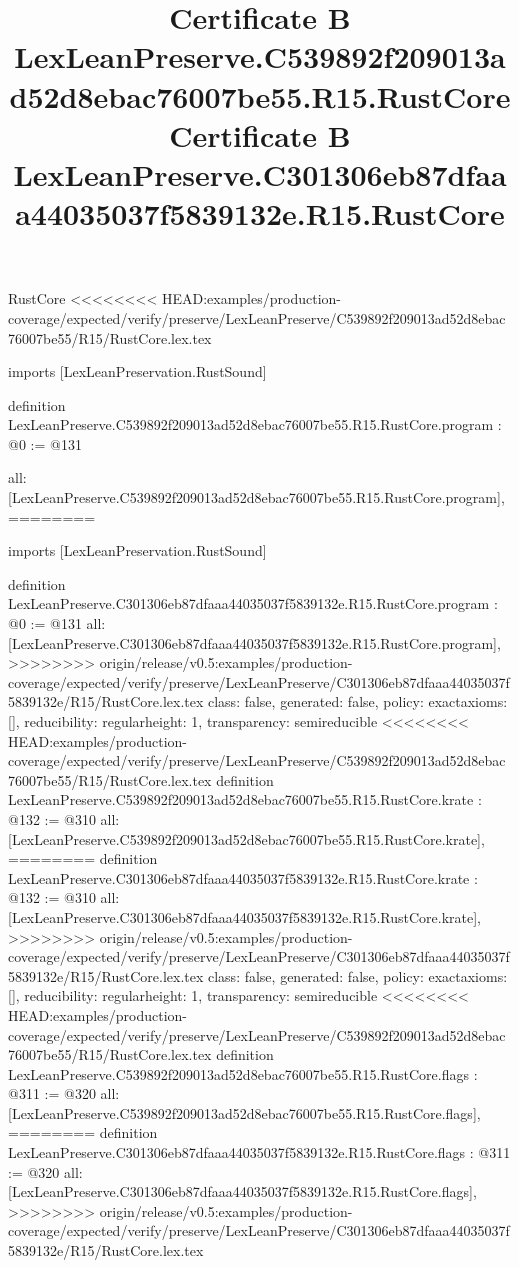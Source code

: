 \begin{lexlean}{RustCore}
<<<<<<<< HEAD:examples/production-coverage/expected/verify/preserve/LexLeanPreserve/C539892f209013ad52d8ebac76007be55/R15/RustCore.lex.tex
\title{Certificate B LexLeanPreserve.C539892f209013ad52d8ebac76007be55.R15.RustCore}
\begin{coremodule}
imports [LexLeanPreservation.RustSound]

definition LexLeanPreserve.C539892f209013ad52d8ebac76007be55.R15.RustCore.program : @0 := @131 {
  all: [LexLeanPreserve.C539892f209013ad52d8ebac76007be55.R15.RustCore.program],
========
\title{Certificate B LexLeanPreserve.C301306eb87dfaaa44035037f5839132e.R15.RustCore}
\begin{coremodule}
imports [LexLeanPreservation.RustSound]

definition LexLeanPreserve.C301306eb87dfaaa44035037f5839132e.R15.RustCore.program : @0 := @131 {
  all: [LexLeanPreserve.C301306eb87dfaaa44035037f5839132e.R15.RustCore.program],
>>>>>>>> origin/release/v0.5:examples/production-coverage/expected/verify/preserve/LexLeanPreserve/C301306eb87dfaaa44035037f5839132e/R15/RustCore.lex.tex
  class: false,
  generated: false,
  policy: exact{axioms: []},
  reducibility: regular{height: 1},
  transparency: semireducible
}
<<<<<<<< HEAD:examples/production-coverage/expected/verify/preserve/LexLeanPreserve/C539892f209013ad52d8ebac76007be55/R15/RustCore.lex.tex
definition LexLeanPreserve.C539892f209013ad52d8ebac76007be55.R15.RustCore.krate : @132 := @310 {
  all: [LexLeanPreserve.C539892f209013ad52d8ebac76007be55.R15.RustCore.krate],
========
definition LexLeanPreserve.C301306eb87dfaaa44035037f5839132e.R15.RustCore.krate : @132 := @310 {
  all: [LexLeanPreserve.C301306eb87dfaaa44035037f5839132e.R15.RustCore.krate],
>>>>>>>> origin/release/v0.5:examples/production-coverage/expected/verify/preserve/LexLeanPreserve/C301306eb87dfaaa44035037f5839132e/R15/RustCore.lex.tex
  class: false,
  generated: false,
  policy: exact{axioms: []},
  reducibility: regular{height: 1},
  transparency: semireducible
}
<<<<<<<< HEAD:examples/production-coverage/expected/verify/preserve/LexLeanPreserve/C539892f209013ad52d8ebac76007be55/R15/RustCore.lex.tex
definition LexLeanPreserve.C539892f209013ad52d8ebac76007be55.R15.RustCore.flags : @311 := @320 {
  all: [LexLeanPreserve.C539892f209013ad52d8ebac76007be55.R15.RustCore.flags],
========
definition LexLeanPreserve.C301306eb87dfaaa44035037f5839132e.R15.RustCore.flags : @311 := @320 {
  all: [LexLeanPreserve.C301306eb87dfaaa44035037f5839132e.R15.RustCore.flags],
>>>>>>>> origin/release/v0.5:examples/production-coverage/expected/verify/preserve/LexLeanPreserve/C301306eb87dfaaa44035037f5839132e/R15/RustCore.lex.tex
}}}
\end{coremodule}}
\end{coremodule}
\end{lexlean}
